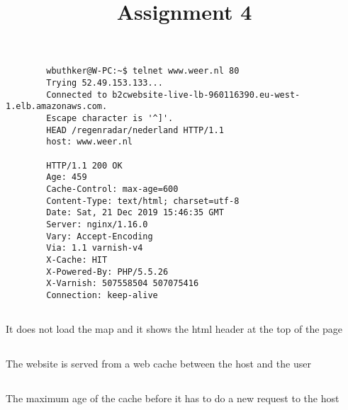 \documentclass{article}
\title{Assignment 4}
\begin{document}
    \maketitle
    \section{}
    \subsection{}
    \begin{verbatim}
        wbuthker@W-PC:~$ telnet www.weer.nl 80
        Trying 52.49.153.133...
        Connected to b2cwebsite-live-lb-960116390.eu-west-1.elb.amazonaws.com.
        Escape character is '^]'.
        HEAD /regenradar/nederland HTTP/1.1
        host: www.weer.nl

        HTTP/1.1 200 OK
        Age: 459
        Cache-Control: max-age=600
        Content-Type: text/html; charset=utf-8
        Date: Sat, 21 Dec 2019 15:46:35 GMT
        Server: nginx/1.16.0
        Vary: Accept-Encoding
        Via: 1.1 varnish-v4
        X-Cache: HIT
        X-Powered-By: PHP/5.5.26
        X-Varnish: 507558504 507075416
        Connection: keep-alive

     \end{verbatim}

     \subsection{}
     It does not load the map and it shows the html header at the top of the page

     \subsection{}
     The website is served from a web cache between the host and the user

     \subsection{}
     The maximum age of the cache before it has to do a new request to the host

     \section{}
     \subsection{}
\end{document}

